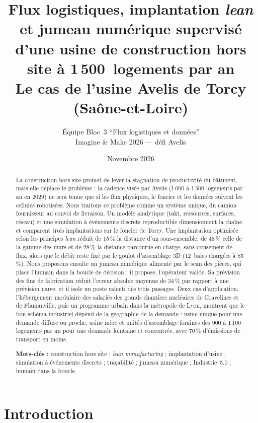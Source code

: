 \documentclass[11pt,a4paper]{article}
\title{\vspace{-1.2cm}\textbf{Flux logistiques, implantation \emph{lean} et jumeau numérique
supervisé d'une usine de construction hors site à 1\,500~logements par an}\\[4pt]
\large Le cas de l'usine Avelis de Torcy (Saône-et-Loire)}
\author{Équipe Bloc~3 \enquote{Flux logistiques et données}\\
\small Imagine \& Make 2026 --- défi Avelis}
\date{Novembre 2026}
\begin{document}
\maketitle

\begin{abstract}
\noindent La construction hors site promet de lever la stagnation de productivité du bâtiment,
mais elle déplace le problème : la cadence visée par Avelis (1\,000 à 1\,500 logements par an
en 2029) ne sera tenue que si les flux physiques, le foncier et les données suivent les cellules
robotisées. Nous traitons ce problème comme un système unique, du camion fournisseur au convoi
de livraison. Un modèle analytique (takt, ressources, surfaces, réseau) et une simulation à
événements discrets reproductible dimensionnent la chaîne et comparent trois implantations sur le
foncier de Torcy. Une implantation optimisée selon les principes \emph{lean} réduit de 15\,\% la
distance d'un sous-ensemble, de 48\,\% celle de la gamme des murs et de 28\,\% la distance
parcourue en charge, sans croisement de flux, alors que le débit reste fixé par le goulot
d'assemblage 3D (12~baies chargées à 85\,\%). Nous proposons ensuite un jumeau numérique alimenté
par le scan des pièces, qui place l'humain dans la boucle de décision : il propose, l'opérateur
valide. Sa prévision des fins de fabrication réduit l'erreur absolue moyenne de 34\,\% par
rapport à une prévision naïve, et il isole un poste ralenti dès trois passages. Deux cas
d'application, l'hébergement modulaire des salariés des grands chantiers nucléaires de Gravelines
et de Flamanville, puis un programme urbain dans la métropole de Lyon, montrent que le bon schéma
industriel dépend de la géographie de la demande : usine unique pour une demande diffuse ou proche,
usine mère et unités d'assemblage foraines dès 900 à 1\,100 logements par an pour une demande
lointaine et concentrée, avec 70\,\% d'émissions de transport en moins.

\medskip\noindent\textbf{Mots-clés :} construction hors site ; \emph{lean manufacturing} ;
implantation d'usine ; simulation à événements discrets ; traçabilité ; jumeau numérique ;
Industrie~5.0 ; humain dans la boucle.
\end{abstract}

\section{Introduction}
\end{document}
